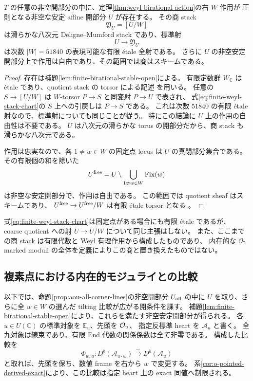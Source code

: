\begin{theorem}
\label{thm:weyl-finite-etale-chart}
$T$ の任意の非空開部分の中に、定理\ref{thm:weyl-birational-action}の右 $W$ 作用が
正則となる非空な安定 affine 開部分 $U$ が存在する。
その商 stack
\[
 \mathfrak Y_U=[U/W]
\]
は滑らかな八次元 Deligne--Mumford stack であり、標準射
\begin{equation}\label{eq:finite-weyl-stack-chart}
 U\longrightarrow\mathfrak Y_U
\end{equation}
は次数 $|W|=51840$ の表現可能な有限 \'etale 全射である。
さらに $U$ の非空安定開部分上で作用は自由であり、その範囲では商はスキームである。
\end{theorem}
\begin{proof}
存在は補題\ref{lem:finite-birational-stable-open}による。
有限定数群 $W_{\mathbb C}$ は \'etale であり、quotient stack の torsor による記述
\cite[Tag 04UV]{Stacks}を用いる。
任意の $S\to[U/W]$ は $W$-torsor $P\to S$ と同変射 $P\to U$ で表され、
式\eqref{eq:finite-weyl-stack-chart}の $S$ 上への引戻しは $P\to S$ である。
これは次数 $51840$ の有限 \'etale 射なので、標準射についても同じことが従う。
特にこの結論に $U$ 上の作用の自由性は不要である。
$U$ は八次元の滑らかな torus の開部分だから、商 stack も滑らかな八次元である。

作用は忠実なので、各 $1\ne w\in W$ の固定点 locus は $U$ の真閉部分集合である。
その有限個の和を除いた
\[
 U^{\rm free}=U\setminus\bigcup_{1\ne w\in W}\operatorname{Fix}(w)
\]
は非空な安定開部分で、作用は自由である。
この範囲では quotient sheaf はスキームであり、
$U^{\rm free}\to U^{\rm free}/W$ は有限 \'etale torsor となる
\cite[Tag 07S7]{Stacks}。
\end{proof}

式\eqref{eq:finite-weyl-stack-chart}は固定点がある場合にも有限 \'etale であるが、
coarse quotient への射 $U\to U/W$ について同じ主張はしない。
また、ここまでの商 stack は有限代数と Weyl 有理作用から構成したものであり、
内在的な $\mathcal O$-marked moduli の全体を定義によりこの商と置き換えたものではない。

\subsection{複素点における内在的モジュライとの比較}

以下では、命題\ref{prop:aou-all-corner-lines}の非空開部分 $U_{\rm all}$ の中に
$U$ を取り、さらに全 $w\in W$ の選んだ tilting 比較が広がる開条件を課す。
補題\ref{lem:finite-birational-stable-open}により、これらを満たす非空安定開部分が得られる。
各 $u\in U(\mathbb C)$ の標準対象を $\mathbb E_u$、先頭を $\mathcal O_u$、
指定反標準 heart を $\mathcal A_u$ と書く。
全九対象は線束であり、有限 End 代数の関係係数は全て非零である。
構成した比較を
\[
 \Phi_{w,u}:D^b(\mathcal A_{u\cdot w})\xrightarrow{\sim}D^b(\mathcal A_u)
\]
と取れば、先頭を保ち、数値 frame を右から $w$ で変更する。
系\ref{cor:o-pointed-derived-exact}により、この比較は指定 heart 上の exact 同値へ制限される。

